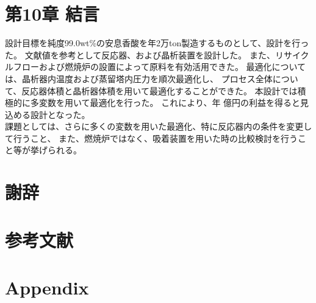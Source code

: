 \documentclass[a4j]{jsarticle}
\begin{document}
\chapter*{第10章 結言}
設計目標を純度99.0wt\%の安息香酸を年2万ton製造するものとして、設計を行った。
文献値を参考として反応器、および晶析装置を設計した。
また、リサイクルフローおよび燃焼炉の設置によって原料を有効活用できた。
最適化については、晶析器内温度および蒸留塔内圧力を順次最適化し、
プロセス全体について、反応器体積と晶析器体積を用いて最適化することができた。
本設計では積極的に多変数を用いて最適化を行った。
これにより、年 億円の利益を得ると見込める設計となった。\\
課題としては、さらに多くの変数を用いた最適化、特に反応器内の条件を変更して行うこと、
また、燃焼炉ではなく、吸着装置を用いた時の比較検討を行うこと等が挙げられる。

\chapter*{謝辞}

\chapter*{参考文献}

\chapter*{Appendix}
\end{document}
